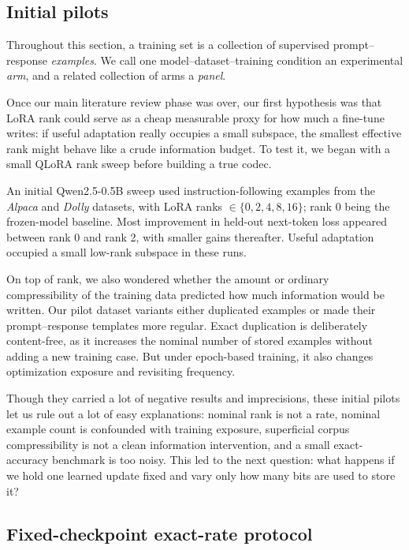 \subsection{Initial pilots}

Throughout this section, a training set is a collection of supervised prompt--response \emph{examples}. We call one model--dataset--training condition an experimental \emph{arm}, and a related collection of arms a \emph{panel}.

Once our main literature review phase was over, our first hypothesis was that LoRA rank could serve as a cheap measurable proxy for how much a fine-tune writes: if useful adaptation really occupies a small subspace, the smallest effective rank might behave like a crude information budget. To test it, we began with a small QLoRA rank sweep before building a true codec.

An initial Qwen2.5-0.5B sweep used instruction-following examples from the \emph{Alpaca} and \emph{Dolly} datasets, with LoRA ranks $\in \{0, 2, 4, 8, 16\}$; rank 0 being the frozen-model baseline. Most improvement in held-out next-token loss appeared between rank 0 and rank 2, with smaller gains thereafter.  Useful adaptation occupied a small low-rank subspace in these runs.

On top of rank, we also wondered whether the amount or ordinary compressibility of the training data predicted how much information would be written. Our pilot dataset variants either duplicated examples or made their prompt--response templates more regular. Exact duplication is deliberately content-free, as it increases the nominal number of stored examples without adding a new training case. But under epoch-based training, it also changes optimization exposure and revisiting frequency.

Though they carried a lot of negative results and imprecisions, these initial pilots let us rule out a lot of easy explanations: nominal rank is not a rate, nominal example count is confounded with training exposure, superficial corpus compressibility is not a clean information intervention, and a small exact-accuracy benchmark is too noisy. This led to the next question: what happens if we hold one learned update fixed and vary only how many bits are used to store it?

\subsection{Fixed-checkpoint exact-rate protocol}

